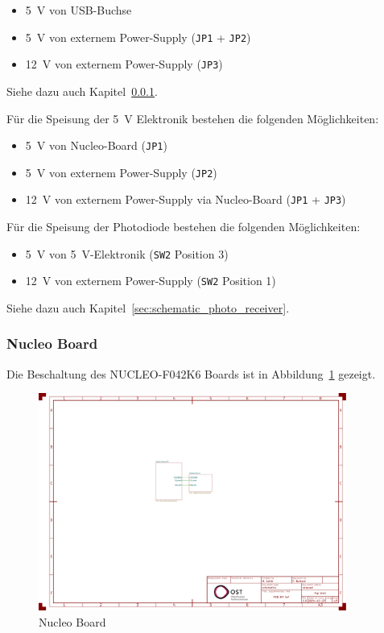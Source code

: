 \begin{itemize}
    \item 5~V von USB-Buchse
    \item 5~V von externem Power-Supply (\lstinline|JP1| + \lstinline|JP2|)
    \item 12~V von externem Power-Supply (\lstinline|JP3|)
\end{itemize}

Siehe dazu auch Kapitel~\ref{sec:schematic_nucleo}.

Für die Speisung der 5~V Elektronik bestehen die folgenden Möglichkeiten:

\begin{itemize}
    \item 5~V von Nucleo-Board (\lstinline|JP1|)
    \item 5~V von externem Power-Supply (\lstinline|JP2|)
    \item 12~V von externem Power-Supply via Nucleo-Board (\lstinline|JP1| + \lstinline|JP3|)
\end{itemize}

Für die Speisung der Photodiode bestehen die folgenden Möglichkeiten:

\begin{itemize}
    \item 5~V von 5~V-Elektronik (\lstinline|SW2| Position 3)
    \item 12~V von externem Power-Supply (\lstinline|SW2| Position 1)
\end{itemize}

Siehe dazu auch Kapitel~\ref{sec:schematic_photo_receiver}.

\subsubsection{Nucleo Board}\label{sec:schematic_nucleo}

Die Beschaltung des NUCLEO-F042K6 Boards \cite{st2024nucleof042k6_usermanual} ist in Abbildung~\ref{fig:nucleo_board}
gezeigt.

\begin{figure}[H]
    \centering
    \includegraphics[page=2, trim=530 580 300 50, clip, width=0.9\textwidth]{attachments/schematic.pdf}
    \caption{Nucleo Board}\label{fig:nucleo_board}
\end{figure}

